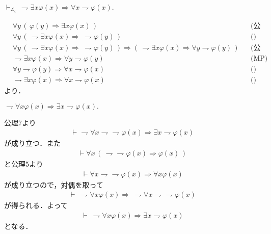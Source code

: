 	\begin{screen}
		\begin{logicalthm}[De Morgan 2]
			$\vdash_{\mathcal{L}_{\in}} \rightharpoondown \exists x \varphi(x)
			\Longrightarrow \forall x \rightharpoondown \varphi(x).$
		\end{logicalthm}
	\end{screen}
	
	\begin{align}
		&\forall y\, (\, \varphi(y) \Longrightarrow \exists x \varphi(x)\, )
		&& \mbox{(公理2)} \\
		&\forall y\, (\, \rightharpoondown \exists x \varphi(x) 
		\Longrightarrow\ \rightharpoondown \varphi(y)\, )
		&& \mbox{()} \\
		&\forall y\, (\, \rightharpoondown \exists x \varphi(x) 
		\Longrightarrow\ \rightharpoondown \varphi(y)\, )
		\Longrightarrow (\, \rightharpoondown \exists x \varphi(x) 
		\Longrightarrow \forall y \rightharpoondown \varphi(y)\, )
		&& \mbox{(公理3)} \\
		&\rightharpoondown \exists x \varphi(x)
		\Longrightarrow \forall y \rightharpoondown \varphi(y)
		&& \mbox{(MP)} \\
		&\forall y \rightharpoondown \varphi(y)
		\Longrightarrow \forall x \rightharpoondown \varphi(x)
		&& \mbox{()} \\
		&\rightharpoondown \exists x \varphi(x)
		\Longrightarrow \forall x \rightharpoondown \varphi(x)
		&& \mbox{()}
	\end{align}
	より．
	
	\begin{screen}
		$\rightharpoondown \forall x \varphi(x) \Longrightarrow
		\exists x \rightharpoondown \varphi(x).$
	\end{screen}
	
	公理7より
	\begin{align}
		\vdash \rightharpoondown \forall x 
		\rightharpoondown \rightharpoondown \varphi(x)
		\Longrightarrow \exists x \rightharpoondown \varphi(x)
	\end{align}
	が成り立つ．また
	\begin{align}
		\vdash \forall x\, (\, \rightharpoondown \rightharpoondown \varphi(x)
		\Longrightarrow \varphi(x)\, )
	\end{align}
	と公理5より
	\begin{align}
		\vdash \forall x \rightharpoondown \rightharpoondown \varphi(x)
		\Longrightarrow \forall x \varphi(x)
	\end{align}
	が成り立つので，対偶を取って
	\begin{align}
		\vdash\ \rightharpoondown \forall x \varphi(x) \Longrightarrow\ 
		\rightharpoondown \forall x \rightharpoondown \rightharpoondown \varphi(x)
	\end{align}
	が得られる．よって
	\begin{align}
		\vdash\ \rightharpoondown \forall x \varphi(x) \Longrightarrow
		\exists x \rightharpoondown \varphi(x)
	\end{align}
	となる．
	
